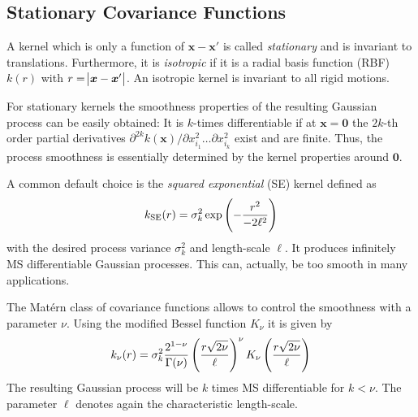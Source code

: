 \documentclass[11pt,a4paper]{scrreprt}
\newcommand{\vc}[1]{\bm{#1}}
\newcommand{\newterm}[1]{\emph{#1}}
\begin{document}

\subsection{Stationary Covariance Functions}
A kernel which is only a function of $\vc x - \vc x'$ is called 
\newterm{stationary} and is invariant to translations. Furthermore, it is 
\newterm{isotropic} if it is a radial basis function (RBF) $k(r)$ with $r 
= \abs{\vc x - \vc x'}$.  An isotropic kernel is invariant to all rigid motions.

For stationary kernels the smoothness properties of the resulting Gaussian 
process can be easily obtained: It is $k$-times differentiable if at $\vc 
x = \vc 0$ the $2k$-th order partial derivatives $\partial^{2k} k(\vc x) 
/ \partial x_{i_1}^2 \dots \partial x_{i_k}^2$ exist and are finite. Thus, the 
process smoothness is essentially determined by the kernel properties around 
$\vc 0$.

A common default choice is the \newterm{squared exponential} (SE) kernel defined 
as
\begin{equation}
    k_{\text{SE}}(r) = \sigma_k^2 \exp\del{-\frac{r^2}{-2\ell^2}}
\end{equation}
with the desired process variance $\sigma_k^2$ and length-scale $\ell$. It 
produces infinitely MS differentiable Gaussian processes. This can, actually, be 
too smooth in many applications.

The Mat\'ern class of covariance functions allows to control the smoothness with 
a parameter $\nu$. Using the modified Bessel function $K_{\nu}$ it is given by
\begin{equation}
    k_{\nu}(r) = \sigma_k^2 \frac{2^{1-\nu}}{\Gamma(\nu)} 
    \del{\frac{r\sqrt{2\nu}}{\ell}}^{\nu} K_{\nu} 
    \del{\frac{r\sqrt{2\nu}}{\ell}}
\end{equation}
The resulting Gaussian process will be $k$ times MS differentiable for $k 
< \nu$. The parameter $\ell$ denotes again the characteristic length-scale.
\end{document}
